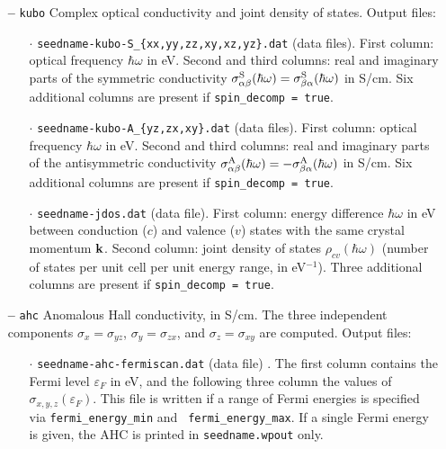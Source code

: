 \begin{itemize}


\item[{\bf --}] \verb#kubo# Complex optical conductivity and joint
  density of states. Output files:

\begin{itemize}

\item[$\cdot$] {\tt seedname-kubo-S\_{\{xx,yy,zz,xy,xz,yz\}.dat}}
  (data files).  First column: optical frequency $\hbar\omega$ in
  eV. Second and third columns: real and imaginary parts of the
  symmetric conductivity $\sigma^{\rm
    S}_{\alpha\beta}(\hbar\omega)=\sigma^{\rm
    S}_{\beta\alpha}(\hbar\omega)$ in S/cm. Six additional columns are
  present if {\tt spin\_decomp = true}.

\item[$\cdot$] {\tt seedname-kubo-A\_{\{yz,zx,xy\}.dat}} (data files).
  First column: optical frequency $\hbar\omega$ in eV. Second and
  third columns: real and imaginary parts of the antisymmetric
  conductivity $\sigma^{\rm A}_{\alpha\beta}(\hbar\omega)=-\sigma^{\rm
    A}_{\beta\alpha}(\hbar\omega)$ in S/cm. Six additional columns are
  present if {\tt spin\_decomp = true}.


\item[$\cdot$] {\tt seedname-jdos.dat} (data file).  First column:
  energy difference $\hbar\omega$ in eV between conduction ($c$) and
  valence ($v$) states with the same crystal momentum ${\bf
    k}$. Second column: joint density of states
  $\rho_{cv}(\hbar\omega)$ (number of states per unit cell per unit
  energy range, in eV$^{-1}$). Three additional columns are present if
  {\tt spin\_decomp = true}.


\end{itemize}

\item[{\bf --}] \verb#ahc# Anomalous Hall conductivity, in S/cm.  The
  three independent components $\sigma_x=\sigma_{yz}$,
  $\sigma_y=\sigma_{zx}$, and $\sigma_z=\sigma_{xy}$ are
  computed. Output files:

\begin{itemize}

\item[$\cdot$] {\tt seedname-ahc-fermiscan.dat} (data file) . The
  first column contains the Fermi level $\varepsilon_F$ in eV, and the
  following three column the values of
  $\sigma_{x,y,z}(\varepsilon_F)$.  This file is written if a range of
  Fermi energies is specified via {\tt fermi\_energy\_min} and {\tt
    fermi\_energy\_max}.  If a single Fermi energy is given, the AHC
  is printed in {\tt seedname.wpout} only.


\end{itemize}
\end{itemize}
